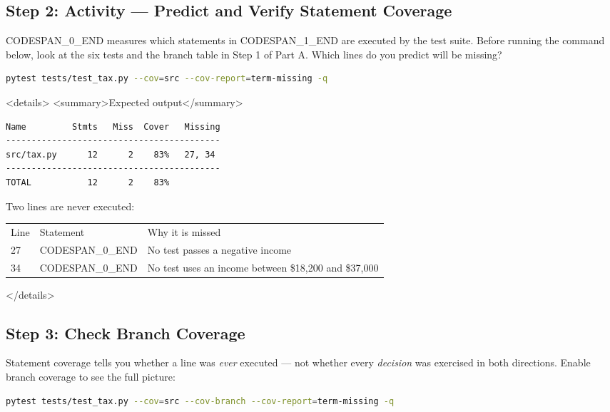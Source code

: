 \documentclass[11pt,a4paper]{book}
\begin{document}
\medskip

\subsection{Step 2: Activity --- Predict and Verify Statement Coverage}

CODESPAN\_0\_END measures which statements in CODESPAN\_1\_END are executed by the test suite. Before running the command below, look at the six tests and the branch table in Step 1 of Part A. Which lines do you predict will be missing?

\begin{lstlisting}[language=Bash]
pytest tests/test_tax.py --cov=src --cov-report=term-missing -q
\end{lstlisting}

<details>
<summary>Expected output</summary>

\begin{lstlisting}
Name         Stmts   Miss  Cover   Missing
------------------------------------------
src/tax.py      12      2    83%   27, 34
------------------------------------------
TOTAL           12      2    83%
\end{lstlisting}

Two lines are never executed:

\begin{tabular}{lll}
\hline
Line & Statement & Why it is missed \\
27 & CODESPAN\_0\_END & No test passes a negative income \\
34 & CODESPAN\_0\_END & No test uses an income between \$18,200 and \$37,000 \\
\hline
\end{tabular}

</details>

\medskip

\subsection{Step 3: Check Branch Coverage}

Statement coverage tells you whether a line was \textit{ever} executed --- not whether every \textit{decision} was exercised in both directions. Enable branch coverage to see the full picture:

\begin{lstlisting}[language=Bash]
pytest tests/test_tax.py --cov=src --cov-branch --cov-report=term-missing -q
\end{lstlisting}
\end{document}

